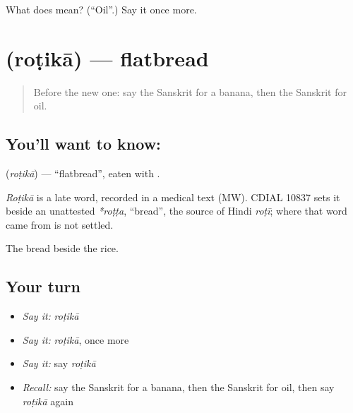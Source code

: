 \begin{tcolorbox}[breakable,colback=teal!4,colframe=teal!35!black,title={Before you move on}]
What does  mean? (\textquotedblleft{}Oil\textquotedblright{}.) Say it once more.
\end{tcolorbox}
\section[\texorpdfstring{\sk{रोटिका} (roṭikā)}{रोटिका (roṭikā)}]{ (roṭikā) — flatbread}

\label{lesson:SA-C78-bread}



\begin{quote}
Before the new one: say the Sanskrit for a banana, then the Sanskrit for oil.
\end{quote}

\subsection*{You'll want to know: }
\textbf{} (\emph{roṭikā}) — \textquotedblleft{}flatbread\textquotedblright{}, eaten with \textbf{}.

\begin{cousinweb}
\emph{Roṭikā} is a late word, recorded in a medical text (MW). CDIAL 10837 sets it beside an unattested \emph{*roṭṭa}, \textquotedblleft{}bread\textquotedblright{}, the source of Hindi \emph{roṭī}; where that word came from is not settled.
\end{cousinweb}

\begin{grammarlens}[title={What you've built}]
The bread beside the rice.
\end{grammarlens}

\subsection*{Your turn}
\begin{itemize}
\raggedright
  \item \emph{Say it:} \emph{roṭikā}
  \item \emph{Say it:} \emph{roṭikā}, once more
  \item \emph{Say it:} say \emph{roṭikā}
  \item \emph{Recall:} say the Sanskrit for a banana, then the Sanskrit for oil, then say \emph{roṭikā} again
\end{itemize}

